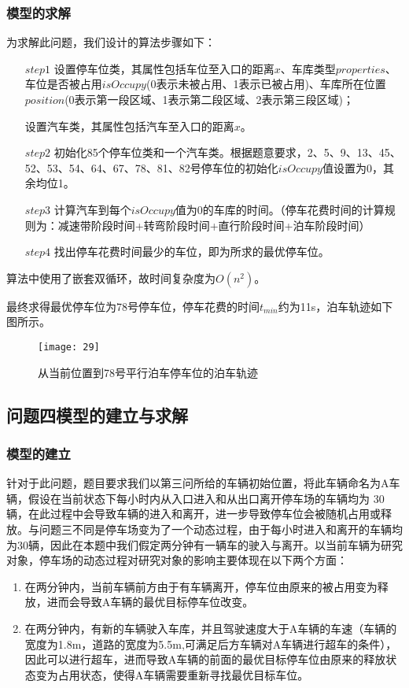 \documentclass{MathorCupmodeling}
\begin{document}
	\subsubsection{模型的求解}
	为求解此问题，我们设计的算法步骤如下：
	\begin{enumerate}
		\item [$step1$]设置停车位类，其属性包括车位至入口的距离$x$、车库类型$properties$、车位是否被占用$isOccupy$(0表示未被占用、1表示已被占用)、车库所在位置$position$(0表示第一段区域、1表示第二段区域、2表示第三段区域)；
		
		设置汽车类，其属性包括汽车至入口的距离$x$。
		\item [$step2$]初始化85个停车位类和一个汽车类。根据题意要求，2、5、9、13、45、52、53、54、64、67、78、81、82号停车位的初始化$isOccupy$值设置为0，其余均位1。
		\item [$step3$]计算汽车到每个$isOccupy$值为0的车库的时间。（停车花费时间的计算规则为：减速带阶段时间+转弯阶段时间+直行阶段时间+泊车阶段时间）
		\item [$step4$]找出停车花费时间最少的车位，即为所求的最优停车位。
	\end{enumerate}
	
	算法中使用了嵌套双循环，故时间复杂度为$O(n^2)$。

	最终求得最优停车位为78号停车位，停车花费的时间$t_{min}$约为11s，泊车轨迹如下图所示。
	\begin{figure}[h]
		\centering
		\texttt{[image: 29]}
		\caption{从当前位置到78号平行泊车停车位的泊车轨迹}
		\label{fig:circuit-diagram}
	\end{figure}






	\subsection{问题四模型的建立与求解}
	\subsubsection{模型的建立}
	针对于此问题，题目要求我们以第三问所给的车辆初始位置，将此车辆命名为A车辆，假设在当前状态下每小时内从入口进入和从出口离开停车场的车辆均为 30 辆，在此过程中会导致车辆的进入和离开，进一步导致停车位会被随机占用或释放。与问题三不同是停车场变为了一个动态过程，由于每小时进入和离开的车辆均为30辆，因此在本题中我们假定两分钟有一辆车的驶入与离开。以当前车辆为研究对象，停车场的动态过程对研究对象的影响主要体现在以下两个方面：
	\begin{enumerate}
		\item 在两分钟内，当前车辆前方由于有车辆离开，停车位由原来的被占用变为释放，进而会导致A车辆的最优目标停车位改变。
		\item 在两分钟内，有新的车辆驶入车库，并且驾驶速度大于A车辆的车速（车辆的宽度为1.8m，道路的宽度为5.5m,可满足后方车辆对A车辆进行超车的条件），因此可以进行超车，进而导致A车辆的前面的最优目标停车位由原来的释放状态变为占用状态，使得A车辆需要重新寻找最优目标车位。
	\end{enumerate}
\end{document}
